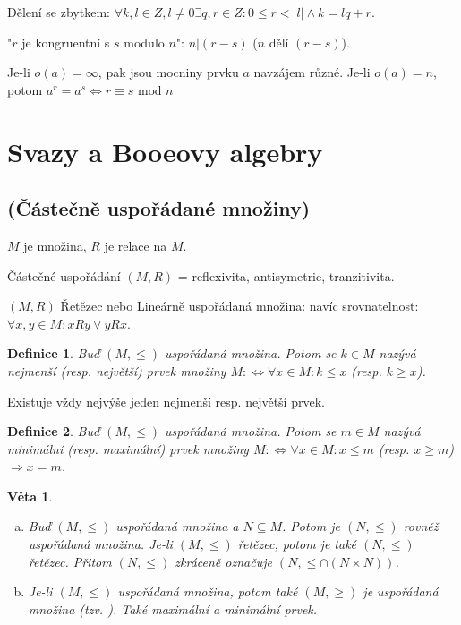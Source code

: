 \documentclass[a4paper, 11pt]{report}
\newtheorem{mydef}{Definice}[chapter]
\newtheorem{veta}{Věta}[chapter]
\begin{document}
Dělení se zbytkem: $\forall k,l \in Z, l \not= 0 \exists q,r \in Z: 0 \leq  r < |l| \land k = lq + r$.

"$r$ je kongruentní s $s$ modulo $n$": $n|(r - s)$ ($n$ dělí $(r-s)$).

Je-li $o(a) = \infty$, pak jsou mocniny prvku $a$ navzájem různé. Je-li $o(a) = n$, potom $a^r = a^s \Leftrightarrow r \equiv s \text{ mod } n$



\section{Svazy a Booeovy algebry}
\subsection{(Částečně uspořádané množiny)}

$M$ je množina, $R$ je relace na $M$. 

Částečné uspořádání $(M, R)$ = reflexivita, antisymetrie, tranzitivita.

$(M, R)$ Řetězec nebo Lineárně uspořádaná množina: navíc srovnatelnost: $\forall x,y \in M: xRy \lor yRx$.

\begin{mydef}
Buď $(M, \leq)$ uspořádaná množina. Potom se $k \in M$ nazývá nejmenší (resp. největší) prvek množiny $M :\Leftrightarrow \forall x \in M: k \leq x$ (resp. $k \geq x$).
\end{mydef}

Existuje vždy nejvýše jeden nejmenší resp. největší prvek.

\begin{mydef}
Buď $(M, \leq)$ uspořádaná množina. Potom se $m \in M$ nazývá minimální (resp. maximální) prvek množiny $M :\Leftrightarrow \forall x \in M: x \leq m$ (resp. $x \geq m$) $\Rightarrow x = m$.
\end{mydef}

\begin{veta}
\begin{enumerate}[a)]
	\item Buď $(M, \leq)$ uspořádaná množina a $N \subseteq M$. Potom je $(N, \leq)$ rovněž uspořádaná množina. Je-li $(M, \leq)$ řetězec, potom je také $(N, \leq)$ řetězec. Přitom $(N, \leq)$ zkráceně označuje $(N, \leq \cap (N \times N))$.
	\item Je-li $(M, \leq)$ uspořádaná množina, potom také $(M, \geq)$ je uspořádaná množina (tzv. ). Také maximální a minimální prvek.
\end{enumerate}
\end{veta}
\end{document}
